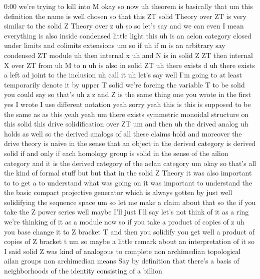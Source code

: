 \begin{unfinished}{0:00}
we're  trying  to  kill  into
M  okay
so  now  uh  theorem  is  basically  that
um  this  definition  the  name  is  well
chosen  so  that  this  ZT  solid  Theory  over
ZT  is  very  similar  to  the  solid  Z  Theory
over  z  uh
so  so  let's
say
and  we  can  even  I  mean  everything  is
also  inside
condensed  little
light  this  uh  is  an  aelon
category  closed
under  limits  and
colimits
extensions  um  so  if  uh  if  m  is  an
arbitrary  say  condensed  ZT
module  uh
then  internal  x  uh  and  N  is  in  solid
Z  ZT  then  internal  X  over  ZT  from  uh  M
to  n  uh  is  also  in  solid
ZT  uh  there  exists  d  uh  there  exists  a
left  ad
joint  to  the  inclusion
uh  call  it  uh  let's  say  well  I'm  going
to  at  least  temporarily  denote  it  by
upper  T  solid  we're  forcing  the  variable
T  to  be  solid  you  could  say  so  that's
uh  z  z  and  Z  is  the  same  thing  one  you
wrote  in  the  first  yes  I  wrote  I  use
different  notation  yeah  sorry  yeah  this
is  this  is  supposed  to  be  the  same  as  as
this
yeah
yeah  um  there  exists  symmetric  monoidal
structure  on  this  solid  this  drive
solidification  over
ZT  um  and  then  uh  the  drived
analog  uh  holds  as
well  so  the  derived  analogs  of  all  these
claims  hold  and  moreover  the  drive
theory  is  naive  in  the  sense  that  an
object  in  the  derived  category  is
derived  solid  if  and  only  if  each
homology  group  is  solid  in  the  sense  of
the  ailion  category  and  it  is  the
derived  category  of  the  aelan
category  um  okay  so  that's  all  the  kind
of  formal  stuff  but  but  that  in  the
solid  Z  Theory  it  was  also  important  to
to  get  a  to  understand  what  was  going  on
it  was  important  to  understand  the  the
basic  compact  projective  generator  which
is  always  gotten  by  just  well
solidifying  the  sequence  space  um  so  let
me  make  a  claim  about  that  so  the  if  you
take  the  Z  power  series  well  maybe  I'll
just  I'll  say  let's  not  think  of  it  as  a
ring  we're  thinking  of  it  as  a  module
now  so  if  you  take  a  product  of  copies
of  z  uh  you  base  change  it  to  Z  bracket
T  and  then  you  solidify  you  get  well  a
product  of  copies  of  Z  bracket
t
um
so  maybe  a  little  remark  about  an
interpretation  of  it  so  I  said  solid  Z
was  kind  of  analogous  to  complete  non
archimedian  topological  ailan  groups  non
archimedian  means  Say  by  definition  that
there's  a  basis  of  neighborhoods  of  the
identity  consisting  of  a  billion

\end{unfinished}
